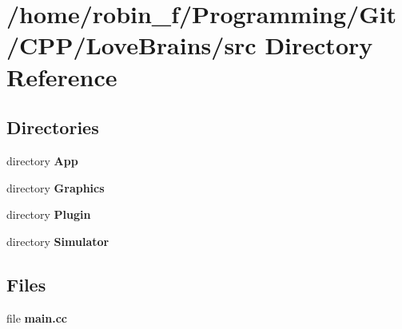 \section{/home/robin\+\_\+f/\+Programming/\+Git/\+C\+P\+P/\+Love\+Brains/src Directory Reference}
\label{dir_d0e2e68946465013f2867de320314ad7}
\subsection*{Directories}
\begin{DoxyCompactItemize}
\item 
directory {\bf App}
\item 
directory {\bf Graphics}
\item 
directory {\bf Plugin}
\item 
directory {\bf Simulator}
\end{DoxyCompactItemize}
\subsection*{Files}
\begin{DoxyCompactItemize}
\item 
file {\bfseries main.\+cc}
\end{DoxyCompactItemize}
